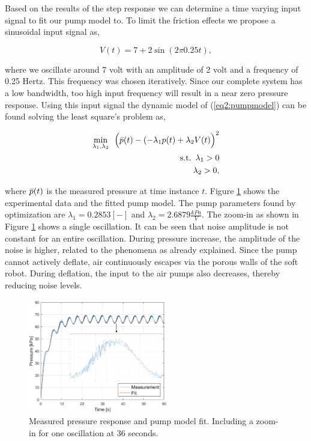 Based on the results of the step response we can determine a time varying input signal to fit our pump model to. To limit the friction effects we propose a sinusoidal input signal as,

\begin{equation}
    V(t) =  7 + 2 \sin(2 \pi 0.25t),
    \label{eq3:vinput}
\end{equation}


where we oscillate around 7 volt with an amplitude of 2 volt and a frequency of 0.25 Hertz. This frequency was chosen iteratively. Since our complete system has a low bandwidth, too high input frequency will result in a near zero pressure response. Using this input signal the dynamic model of (\ref{eq2:pumpmodel}) can be found solving the least square's problem as,

\begin{equation}
   \begin{aligned}
\min_{\lambda_1,\lambda_2} \hspace{5pt}  \Big(\Bar{p}(t) - (-\lambda_1 p(t) +\lambda_2 V(t)\Big)^2   \\ 
\text{s.t.} \hspace{5pt} \lambda_1 > 0 \\
\lambda_2 > 0,
\end{aligned}
\end{equation}

where $\Bar{p}(t)$ is the measured pressure at time instance $t$. Figure \ref{fig3:pumpfit} shows the experimental data and the fitted pump model. The pump parameters found by optimization are $\lambda_1 = 0.2853 [-]$ and $\lambda_2 = 2.6879 \frac{kPa}{V}$. The zoom-in as shown in Figure \ref{fig3:pumpfit} shows a single oscillation. It can be seen that noise amplitude is not constant for an entire oscillation. During pressure increase, the amplitude of the noise is higher, related to the phenomena as already explained. Since the pump cannot actively deflate, air continuously escapes via the porous walls of the soft robot. During deflation, the input to the air pumps also decreases, thereby reducing noise levels. 

\begin{figure}[H]
    \centering
    \includegraphics[width = 0.55\textwidth]{Figures/Chapter3/expfitzoom.png}
    \caption{Measured pressure response and pump model fit. Including a zoom-in for one oscillation at 36 seconds.}
    \label{fig3:pumpfit}
\end{figure}





